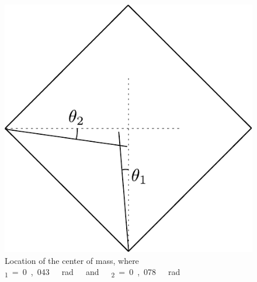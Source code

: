 \begin{figure}[H]
	\centering
	\includegraphics[scale=0.65]{figures/centerOfMassDiagram}
	\caption{Location of the center of mass, where \si{\theta_1=0,043\ rad\ and\ \theta_2=0,078\ rad}}
	\label{centerOfMassDiagram2}
\end{figure}